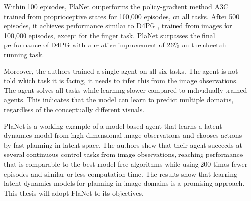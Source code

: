Within 100 episodes, PlaNet outperforms the policy-gradient method A3C \cite{Algo.A3C} trained from proprioceptive states for 100,000 episodes, on all tasks. After 500 episodes, it achieves performance similar to D4PG \cite{Algo.D4PG}, trained from images for 100,000 episodes, except for the finger task. PlaNet surpasses the final performance of D4PG with a relative improvement of 26\% on the cheetah running task.

Moreover, the authors trained a single agent on all six tasks. The agent is not told which task it is facing, it needs to infer this from the image observations. The agent solves all tasks while learning slower compared to individually trained agents. This indicates that the model can learn to predict multiple domains, regardless of the conceptually different visuals.

PlaNet is a working example of a model-based agent that learns a latent dynamics model from high-dimensional image observations and chooses actions by fast planning in latent space. The authors show that their agent succeeds at several continuous control tasks from image observations, reaching performance that is comparable to the best model-free algorithms while using 200 times fewer episodes and similar or less computation time. The results show that learning latent dynamics models for planning in image domains is a promising approach. This thesis will adopt PlaNet to its objectives.
